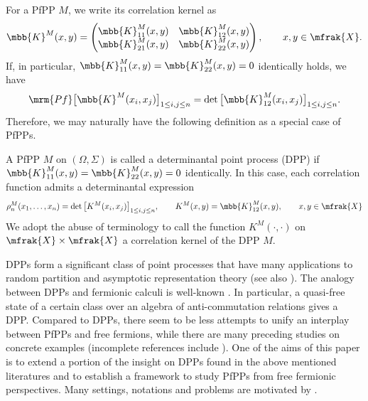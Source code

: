 For a PfPP $M$, we write its correlation kernel as
\begin{equation*}
	\mbb{K}^{M}(x,y)
	=\left(
	\begin{matrix}
		\mbb{K}_{11}^{M}(x,y) & \mbb{K}_{12}^{M}(x,y) \\
		\mbb{K}_{21}^{M}(x,y) & \mbb{K}_{22}^{M}(x,y)
	\end{matrix}
	\right),\qquad x,y\in\mfrak{X}.
\end{equation*}
If, in particular, $\mbb{K}_{11}^{M}(x,y)=\mbb{K}_{22}^{M}(x,y)=0$ identically holds, we have
\begin{equation*}
	\mrm{Pf}\big[\mbb{K}^{M}(x_{i},x_{j})\big]_{1\le i,j\le n}=\det \big[\mbb{K}_{12}^{M}(x_{i},x_{j})\big]_{1\le i,j\le n}.
\end{equation*}
Therefore, we may naturally have the following definition as a special case of PfPPs.

\begin{Definition}
A PfPP $M$ on $(\Omega,\Sigma)$ is called a determinantal point process (DPP) if $\mbb{K}^{M}_{11}(x,y)\allowbreak =\mbb{K}^{M}_{22}(x,y)=0$ identically.
In this case, each correlation function admits a determinantal expression
\begin{equation*}
	\rho_{n}^{M}(x_{1},\dots, x_{n})=\det \big[K^{M}(x_{i},x_{j})\big]_{1\le i,j\le n},\qquad K^{M}(x,y)=\mbb{K}^{M}_{12}(x,y),\qquad x,y\in\mfrak{X}
\end{equation*}
We adopt the abuse of terminology to call the function $K^{M}(\cdot,\cdot)$ on $\mfrak{X}\times\mfrak{X}$ a correlation kernel of the DPP $M$.
\end{Definition}

DPPs form a significant class of point processes that have many applications to random partition and asymptotic representation theory \cite{Borodin1998a, BorodinOlshanski1998a, Borodin1998b,BorodinOlshanski1998b,Okounkov2001,Olshanski1998, Olshanski2003} (see also \cite{Borodin2011,BenHoughKrishnapurPeresVirag2006, Lyons2003, Soshnikov2000}). The analogy between DPPs and fermionic calculi is well-known \cite{Lytvynov2002,LytvynovMei2007,Olshanski2020, ShiraiTakahashi2003a, ShiraiTakahashi2003b, Spohn1987}. In particular, a quasi-free state of a certain class over an algebra of anti-commutation relations gives a DPP.
Compared to DPPs, there seem to be less attempts to unify an interplay between PfPPs and free fermions, while there are many preceding studies on concrete examples (incomplete references include \cite{BorodinRains2005, Ferrari2004, KatoriTanemura2007,Matsumoto2005, MatsumotoShirai2013,Nagao2007,Rains2000,Vuletic2007,WangLi2019}).
One of the aims of this paper is to extend a portion of the insight on DPPs found in the above mentioned literatures and to establish a framework to study PfPPs from free fermionic perspectives. Many settings, notations and problems are motivated by \cite{Olshanski2020}.

